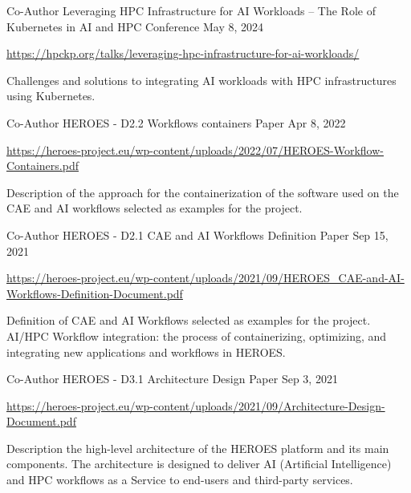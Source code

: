 
\begin{cventries}

\cventry
{Co-Author}
{Leveraging HPC Infrastructure for AI Workloads – The Role of Kubernetes in AI and HPC}
{Conference}
{May 8, 2024}
{
    \begin{cvitems}
    \item {\url{https://hpckp.org/talks/leveraging-hpc-infrastructure-for-ai-workloads/}}
    \item {Challenges and solutions to integrating AI workloads with HPC infrastructures using Kubernetes.}
    \end{cvitems}
}

\cventry
{Co-Author}
{HEROES - D2.2 Workflows containers}
{Paper}
{Apr 8, 2022}
{
    \begin{cvitems}
    \item {\url{https://heroes-project.eu/wp-content/uploads/2022/07/HEROES-Workflow-Containers.pdf}}
    \item {Description of the approach for the containerization of the software used on the CAE and AI workflows selected as examples for the project.}
    \end{cvitems}
}
\cventry
{Co-Author}
{HEROES - D2.1 CAE and AI Workflows Definition}
{Paper}
{Sep 15, 2021}
{
    \begin{cvitems}
    \item {\url{https://heroes-project.eu/wp-content/uploads/2021/09/HEROES\_CAE-and-AI-Workflows-Definition-Document.pdf}}
    \item {Definition of CAE and AI Workflows selected as examples for the project. AI/HPC Workflow integration: the process of containerizing, optimizing, and integrating new applications and workflows in HEROES.}
    \end{cvitems}
}

\cventry
{Co-Author}
{HEROES - D3.1 Architecture Design}
{Paper}
{Sep 3, 2021}
{
    \begin{cvitems}
    \item {\url{https://heroes-project.eu/wp-content/uploads/2021/09/Architecture-Design-Document.pdf}}
    \item {Description the high-level architecture of the HEROES platform and its main components. The architecture is designed to deliver AI (Artificial Intelligence) and HPC workflows as a Service to end-users and third-party services.}
    \end{cvitems}
}
\end{cventries}

